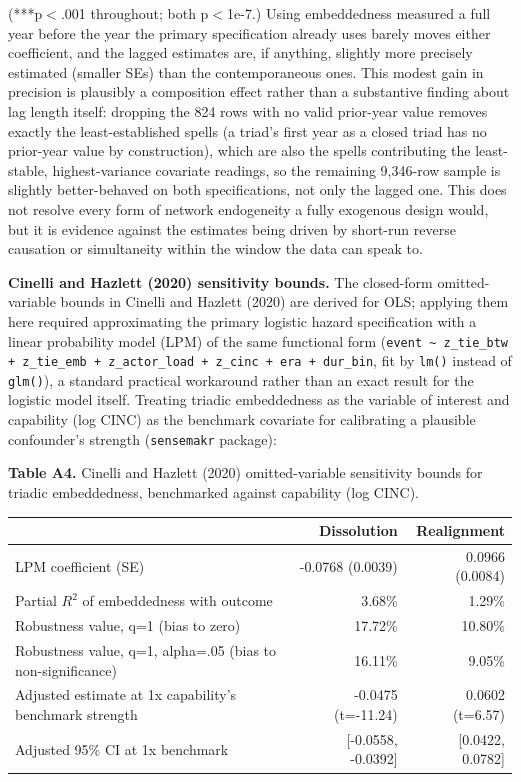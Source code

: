 \documentclass[Afour,sageh,times,doublespace]{sagej}
\begin{document}
(***p$<$.001 throughout; both p$<$1e-7.) Using embeddedness measured a full year before the year the primary specification already uses barely moves either coefficient, and the lagged estimates are, if anything, slightly more precisely estimated (smaller SEs) than the contemporaneous ones. This modest gain in precision is plausibly a composition effect rather than a substantive finding about lag length itself: dropping the 824 rows with no valid prior-year value removes exactly the least-established spells (a triad's first year as a closed triad has no prior-year value by construction), which are also the spells contributing the least-stable, highest-variance covariate readings, so the remaining 9,346-row sample is slightly better-behaved on both specifications, not only the lagged one. This does not resolve every form of network endogeneity a fully exogenous design would, but it is evidence against the estimates being driven by short-run reverse causation or simultaneity within the window the data can speak to.

\textbf{Cinelli and Hazlett (2020) sensitivity bounds.} The closed-form omitted-variable bounds in Cinelli and Hazlett (2020) are derived for OLS; applying them here required approximating the primary logistic hazard specification with a linear probability model (LPM) of the same functional form (\texttt{event \textasciitilde\ z\_tie\_btw + z\_tie\_emb + z\_actor\_load + z\_cinc + era + dur\_bin}, fit by \texttt{lm()} instead of \texttt{glm()}), a standard practical workaround rather than an exact result for the logistic model itself. Treating triadic embeddedness as the variable of interest and capability (log CINC) as the benchmark covariate for calibrating a plausible confounder's strength (\texttt{sensemakr} package):

\begin{table}[t]
\centering
\textbf{Table A4.} Cinelli and Hazlett (2020) omitted-variable sensitivity bounds for triadic embeddedness, benchmarked against capability (log CINC).

\vspace{4pt}
{\small\sf
\begin{tabular}{lrr}
\toprule
& Dissolution & Realignment\\
\midrule
LPM coefficient (SE) & -0.0768 (0.0039) & 0.0966 (0.0084)\\
Partial $R^2$ of embeddedness with outcome & 3.68\% & 1.29\%\\
Robustness value, q=1 (bias to zero) & 17.72\% & 10.80\%\\
Robustness value, q=1, alpha=.05 (bias to non-significance) & 16.11\% & 9.05\%\\
Adjusted estimate at 1x capability's benchmark strength & -0.0475 (t=-11.24) & 0.0602 (t=6.57)\\
Adjusted 95\% CI at 1x benchmark & [-0.0558, -0.0392] & [0.0422, 0.0782]\\
\bottomrule
\end{tabular}
\par}
\end{table}
\end{document}
